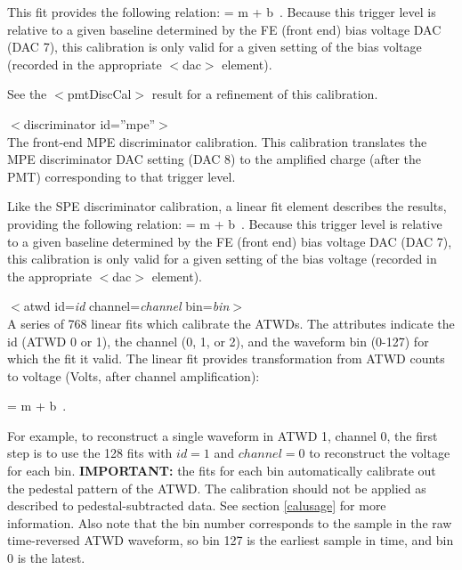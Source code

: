 \documentclass[10pt]{article}
\begin{document}
This fit provides the following relation:
\be
{} = m \cdot {} + b\ .
\ee
\noindent Because this trigger level is relative to a given baseline
determined by the FE (front end) bias voltage DAC (DAC 7), this calibration
is only valid for a given setting of the bias voltage (recorded in the
appropriate $<$dac$>$ element). 

See the $<$pmtDiscCal$>$ result for a refinement of this calibration. 
\ei %


\item{$<$discriminator id=''mpe''$>$}\\
 The front-end MPE discriminator calibration.  This calibration translates the
 MPE discriminator DAC setting (DAC 8) to the amplified charge (after the
 PMT) corresponding to that trigger level. 

 Like the SPE discriminator calibration, a linear fit element describes the
 results, providing the following relation:
 \be
  = m \cdot {} + b\ .
 \ee
 \noindent Because this trigger level is relative to a given baseline
 determined by the FE (front end) bias voltage DAC (DAC 7), this calibration
 is only valid for a given setting of the bias voltage (recorded in the
 appropriate $<$dac$>$ element). 


\item{$<$atwd id=\textit{id} channel=\textit{channel} bin=\textit{bin}$>$}\\ 
A series of 768 linear fits which calibrate the ATWDs.  The attributes
indicate the id (ATWD 0 or 1), the channel (0, 1, or 2), and the waveform
bin (0-127) for which the fit it valid.  The linear fit provides
transformation from ATWD counts to voltage (Volts, after channel
amplification): 

\be
{} = m \cdot {} + b\ .
\ee

For example, to reconstruct a single waveform in ATWD 1, channel 0, the
first step is to use the 128 fits with $id=1$ and $channel=0$ to reconstruct
the voltage for each bin. {\bf IMPORTANT:} the fits for each bin
automatically calibrate out the pedestal pattern of the ATWD.  The
calibration should not be applied as described to pedestal-subtracted
data.  See section \ref{calusage} for more information.  Also note that the
bin number corresponds to the sample in the raw time-reversed ATWD
waveform, so bin 127 is the earliest sample in time, and bin 0 is the latest.
\end{document}

